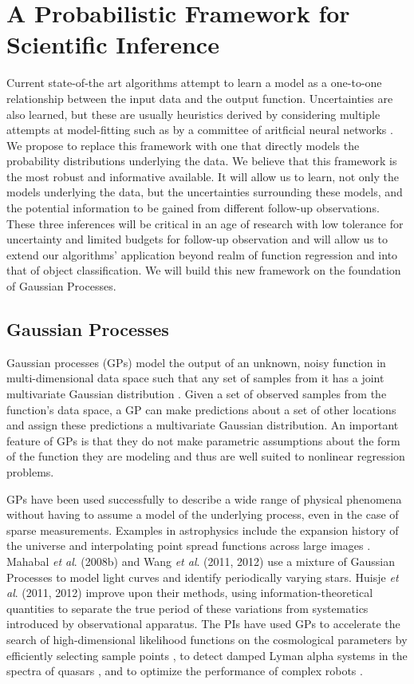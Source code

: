 \documentclass[useAMS,usenatbib,tightenlines,11pt,preprint]{aastex}
\begin{document}
\section{A Probabilistic Framework for Scientific Inference}

Current state-of-the art algorithms attempt to learn a 
model as a one-to-one
relationship between the input data and the output function. Uncertainties are
also learned, but these are usually heuristics derived by considering multiple
attempts at model-fitting such as by a committee of aritficial neural networks
\cite{annz}.  We propose to replace this framework with one that directly models
the probability distributions underlying the data.
We believe that this framework
is the most robust and informative available.  It will allow us
to learn, not only
the models underlying the data, but the uncertainties surrounding these models,
and the potential information to be gained from different follow-up
observations.  These three inferences will be critical in an age of
research with low tolerance for uncertainty and limited budgets for
follow-up observation and will allow us to extend our algorithms' application
beyond realm of function regression and into that of object classification.
We will build this new framework on the foundation of Gaussian Processes.  

\subsection{Gaussian Processes}
\label{sec:gp}


Gaussian processes (GPs) model the output of an unknown, noisy function
in multi-dimensional data space
such that any set of samples from it has a joint multivariate Gaussian
distribution \cite{gp}.  Given a set of observed samples from the function's
data space, a GP
can make predictions about a set of other locations and assign these
predictions a multivariate Gaussian distribution.  An important
feature of GPs is that they do not make parametric assumptions about the
form of the function they are modeling and thus are well suited to
nonlinear regression problems.

GPs have been used successfully to describe a wide range of physical
phenomena without having to assume a model of the underlying process, even
in the case of sparse measurements.  Examples in astrophysics include the
expansion history of the universe \cite{ericgp} and interpolating point
spread functions across large images \cite{psf}.  Mahabal {\it et al}. (2008b) 
and Wang {\it et al}. (2011,
2012) use a mixture of Gaussian Processes to model light curves and
identify periodically varying stars.  Huisje {\it et al}. (2011, 2012)
improve upon their methods, using information-theoretical quantities to
separate the true period of these variations from systematics introduced by
observational apparatus.  The PIs have used GPs to accelerate the search of
high-dimensional likelihood functions on the cosmological parameters by
efficiently selecting sample points \cite{daniel2012}, to detect damped Lyman
alpha systems in the spectra of quasars \cite{Garnett12a}, and to optimize the
performance of complex robots \cite{Tesch11a,Tesch11b,Tesch13}.
\end{document}
